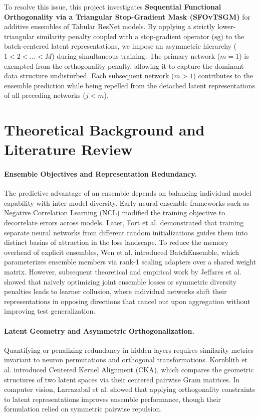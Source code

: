 \documentclass[11pt, a4paper]{article}
\begin{document}
To resolve this issue, this project investigates \textbf{Sequential Functional Orthogonality via a Triangular Stop-Gradient Mask (SFOvTSGM)} for additive ensembles of Tabular ResNet models. By applying a strictly lower-triangular similarity penalty coupled with a stop-gradient operator ($\text{sg}$) to the batch-centered latent representations, we impose an asymmetric hierarchy ($1 < 2 < \dots < M$) during simultaneous training. The primary network ($m=1$) is exempted from the orthogonality penalty, allowing it to capture the dominant data structure undisturbed. Each subsequent network ($m > 1$) contributes to the ensemble prediction while being repelled from the detached latent representations of all preceding networks ($j < m$).


\section{Theoretical Background and Literature Review}
\paragraph{Ensemble Objectives and Representation Redundancy.}
The predictive advantage of an ensemble depends on balancing individual model capability with inter-model diversity. Early neural ensemble frameworks such as Negative Correlation Learning (NCL) \cite{liu1999ensemble} modified the training objective to decorrelate errors across models. Later, Fort et al. \cite{fort2019deep} demonstrated that training separate neural networks from different random initializations guides them into distinct basins of attraction in the loss landscape. To reduce the memory overhead of explicit ensembles, Wen et al. \cite{wen2020batchensemble} introduced BatchEnsemble, which parameterizes ensemble members via rank-1 scaling adapters over a shared weight matrix. However, subsequent theoretical and empirical work by Jeffares et al. \cite{jeffares2023joint} showed that naively optimizing joint ensemble losses or symmetric diversity penalties leads to learner collusion, where individual networks shift their representations in opposing directions that cancel out upon aggregation without improving test generalization.

\paragraph{Latent Geometry and Asymmetric Orthogonalization.}
Quantifying or penalizing redundancy in hidden layers requires similarity metrics invariant to neuron permutations and orthogonal transformations. Kornblith et al. \cite{kornblith2019similarity} introduced Centered Kernel Alignment (CKA), which compares the geometric structures of two latent spaces via their centered pairwise Gram matrices. In computer vision, Larrazabal et al. \cite{larrazabal2021orthogonal} showed that applying orthogonality constraints to latent representations improves ensemble performance, though their formulation relied on symmetric pairwise repulsion.
\end{document}
